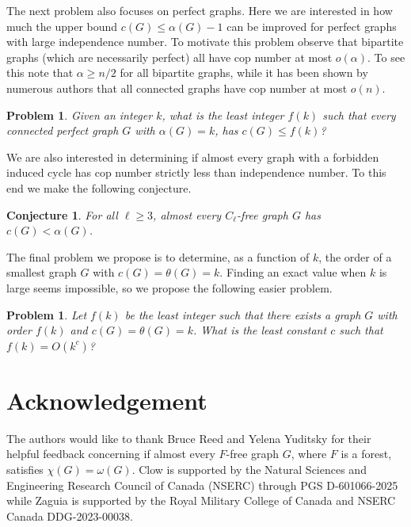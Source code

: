 \documentclass[12pt]{amsart}
\newtheorem{conjecture}[theorem]{Conjecture}
\newtheorem{problem}[theorem]{Problem}
\theoremstyle{definition}
\begin{document}
The next problem also focuses on perfect graphs.
Here we are interested in how much the upper bound $c(G) \leq \alpha(G)-1$ can be improved for perfect graphs with large independence number.
To motivate this problem observe that bipartite graphs (which are necessarily perfect) all have cop number at most $o(\alpha)$.
To see this note that $\alpha\geq n/2$ for all bipartite graphs, while it has been shown by numerous authors that all connected graphs have cop number at most $o(n)$.


\begin{problem}
    Given an integer $k$, what is the least integer $f(k)$ such that every connected perfect graph $G$ with $\alpha(G) = k$,
    has $c(G) \leq f(k)$?
\end{problem}


We are also interested in determining if almost every graph with a forbidden induced cycle has cop number strictly less than independence number.
To this end we make the following conjecture.

\begin{conjecture}
    For all $\ell\geq 3$, almost every $C_\ell$-free graph $G$ has $c(G) < \alpha(G)$.
\end{conjecture}

The final problem we propose is to determine, as a function of $k$, the order of a smallest graph $G$ with $c(G) = \theta(G) = k$.
Finding an exact value when $k$ is large seems impossible, so we propose the following easier problem.

\begin{problem}
    Let $f(k)$ be the least integer such that there exists a graph $G$ with order $f(k)$ and $c(G) = \theta(G) = k$.
    What is the least constant $c$ such that $f(k) = O(k^{c})$?
\end{problem}


\section*{Acknowledgement}
The authors would like to thank Bruce Reed and Yelena Yuditsky for their helpful feedback concerning 
if almost every $F$-free graph $G$, where $F$ is a forest, satisfies $\chi(G) = \omega(G)$.
Clow is supported by the Natural Sciences and Engineering Research Council of Canada (NSERC) through PGS D-601066-2025
while
Zaguia is supported by the Royal Military College of Canada and NSERC Canada DDG-2023-00038.





\end{document}
